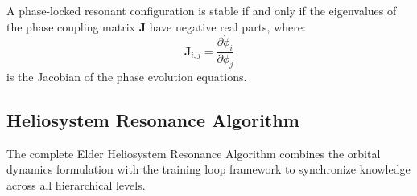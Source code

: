\begin{lemma}
A phase-locked resonant configuration is stable if and only if the eigenvalues of the phase coupling matrix $\mathbf{J}$ have negative real parts, where:
\begin{equation}
\mathbf{J}_{i,j} = \frac{\partial \dot{\phi}_i}{\partial \phi_j}
\end{equation}
is the Jacobian of the phase evolution equations.
\end{lemma}

\subsection{Heliosystem Resonance Algorithm}

The complete Elder Heliosystem Resonance Algorithm combines the orbital dynamics formulation with the training loop framework to synchronize knowledge across all hierarchical levels.

